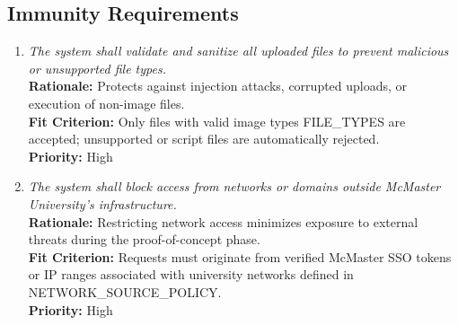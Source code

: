 \documentclass[12pt]{article}
\begin{document}
\subsection{Immunity Requirements}
\begin{enumerate}[label=SR-IM \arabic*., wide=0pt, leftmargin=*]
\item \emph{The system shall validate and sanitize all uploaded files to prevent malicious or unsupported file types.}\\[2mm] 
    {\bf Rationale:} Protects against injection attacks, corrupted uploads, or execution of non-image files.\\
    {\bf Fit Criterion:} Only files with valid image types FILE\_TYPES are accepted; unsupported or script files are automatically rejected.\\
    {\bf Priority:} High

\item \emph{The system shall block access from networks or domains outside McMaster University’s infrastructure.}\\[2mm] 
    {\bf Rationale:} Restricting network access minimizes exposure to external threats during the proof-of-concept phase.\\
    {\bf Fit Criterion:} Requests must originate from verified McMaster SSO tokens or IP ranges associated with university networks defined in NETWORK\_SOURCE\_POLICY.\\
    {\bf Priority:} High
\end{enumerate}
\end{document}
